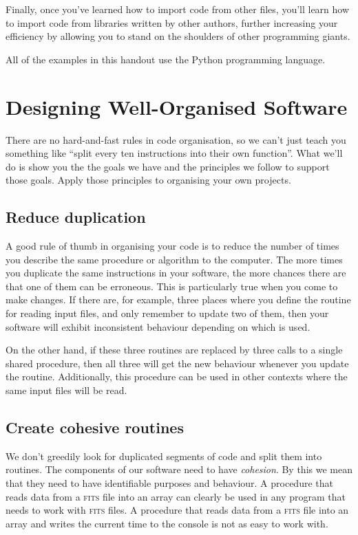 \documentclass[a4paper]{article}
\begin{document}
Finally, once you've learned how to import code from other files, you'll learn how to import code from libraries written by other authors, further increasing your efficiency by allowing you to stand on the shoulders of other programming giants.

All of the examples in this handout use the Python programming language.

\section{Designing Well-Organised Software}

There are no hard-and-fast rules in code organisation, so we can't just teach you something like ``split every ten instructions into their own function''.
What we'll do is show you the the goals we have and the principles we follow to support those goals.
Apply those principles to organising your own projects.

\subsection{Reduce duplication}

A good rule of thumb in organising your code is to reduce the number of times you describe the same procedure or algorithm to the computer.
The more times you duplicate the same instructions in your software, the more chances there are that one of them can be erroneous.
This is particularly true when you come to make changes.
If there are, for example, three places where you define the routine for reading input files, and only remember to update two of them, then your software will exhibit inconsistent behaviour depending on which is used.

On the other hand, if these three routines are replaced by three calls to a single shared procedure, then all three will get the new behaviour whenever you update the routine.
Additionally, this procedure can be used in other contexts where the same input files will be read.

\subsection {Create cohesive routines}

We don't greedily look for duplicated segments of code and split them into routines.
The components of our software need to have \textit{cohesion}.
By this we mean that they need to have identifiable purposes and behaviour.
A procedure that reads data from a \textsc{fits} file into an array can clearly be used in any program that needs to work with \textsc{fits} files.
A procedure that reads data from a \textsc{fits} file into an array and writes the current time to the console is not as easy to work with.
\end{document}

